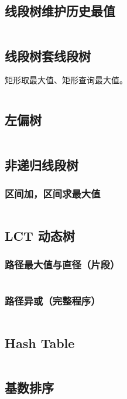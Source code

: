				\subsection{线段树维护历史最值}
					\inputminted{cpp}{sections/DataStructures/assets/DataStructure/历史最值问题.cpp}
				\subsection{线段树套线段树}
					矩形取最大值、矩形查询最大值。
					\inputminted{cpp}{sections/DataStructures/assets/DataStructure/树套树支持矩阵取max 矩阵求max.cpp}
				\subsection{左偏树}
					\inputminted{cpp}{sections/DataStructures/assets/DataStructure/左偏树.cpp}
				\subsection{非递归线段树}
					\subsubsection{区间加，区间求最大值}
						\inputminted{cpp}{sections/DataStructures/assets/DataStructure/非递归线段树求最大值.cpp}
				\subsection{LCT 动态树}
					\subsubsection{路径最大值与直径（片段）}
					\inputminted{cpp}{sections/DataStructures/assets/DataStructure/LCT.cpp}
					\subsubsection{路径异或（完整程序）}
					\inputminted[breakanywhere=true]{cpp}{sections/DataStructures/assets/DataStructure/LCT-路径异或.cpp}

				\subsection{Hash Table}
					\inputminted[highlightlines={4,15,17,18}]{cpp}{sections/DataStructures/assets/DataStructure/hashmap.cpp}
				\subsection{基数排序}
					\inputminted{cpp}{sections/DataStructures/assets/Miscellany/RadixSort.cpp}
